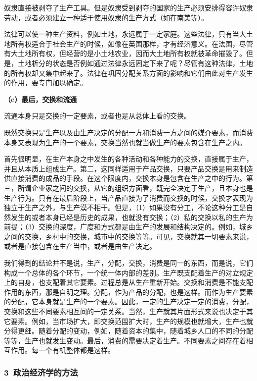 \documentclass[a4paper,twoside,12pt]{ctexart}
\begin{document}
奴隶直接被剥夺了生产工具。但是奴隶受到剥夺的国家的生产必须安排得容许奴隶劳动，或者必须建立一种适于使用奴隶的生产方式（如在南美等）。

法律可以使一种生产资料，例如土地，永远属于一定家庭。这些法律，只有当大土地所有权适合于社会生产的时候，如像在英国那样，才有经济意义。在法国，尽管有大土地所有权，但经营的是小土地农业，因而大土地所有权就被革命摧毁了。但是，土地析分的状态是否例如通过法律永远固定下来了呢？尽管有这种法律，土地的所有权却又集中起来了。法律在巩固分配关系方面的影响和它们由此对生产发生的作用，要专门加以确定。

\textbf{（c）最后，交换和流通}

流通本身只是交换的一定要素，或者也是从总体上看的交换。

既然交换只是生产以及由生产决定的分配一方和消费一方之间的媒介要素，而消费本身又表现为生产的一个要素，交换当然也就当做生产的要素包含在生产之内。

首先很明显，在生产本身之中发生的各种活动和各种能力的交换，直接属于生产，并且从本质上组成生产。第二，这同样适用于产品交换，只要产品交换是用来制造供直接消费的成品的手段。在这个限度内，交换本身是包含在生产之中的行为。第三，所谓企业家之间的交换，从它的组织方面看，既完全决定于生产，且本身也是生产行为。只有在最后阶段上，当产品直接为了消费而交换的时候，交换才表现为独立于生产之外，与生产漠不相干。但是，（1）如果没有分工，不论这种分工是自然发生的或者本身已经是历史的成果，也就没有交换；（2）私的交换以私的生产为前提；（3）交换的深度，广度和方式都是由生产的发展和结构决定的。例如，城乡之间的交换，乡村中的交换，城市中的交换等等。可见，交换就其一切要素来说，或者是直接包含在生产当中，或者是由生产决定。

我们得到的结论并不是说，生产，分配，交换，消费是同一的东西，而是说，它们构成一个总体的各个环节，一个统一体内部的差别。生产既支配着生产的对立规定上的自身，也支配着其它要素。过程总是从生产重新开始。交换和消费是不能支配作用的东西，那是自明之理。分配，作为产品的分配，也是这样。而作为生产要素的分配，它本身就是生产的一个要素。因此，一定的生产决定一定的消费，分配，交换和这些不同要素相互间的一定关系。当然，生产就其片面形式来说也决定于其它要素。例如，当市场扩大，即交换范围扩大时，生产的规模也就增大，生产也就分得更细。随着分配的变动，例如，随着资本的集中，随着城乡人口的不同的分配等等，生产也就发生变动。最后，消费的需要决定着生产。不同要素之间存在着相互作用。每一个有机整体都是这样。

\subsubsection{3~政治经济学的方法}
\end{document}
